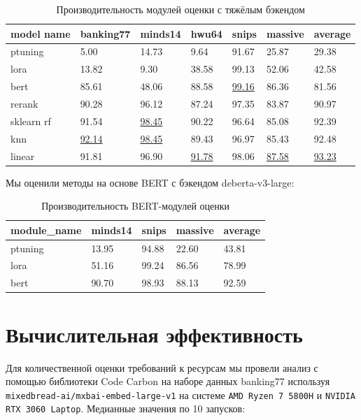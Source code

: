 \documentclass[14pt,a4paper,oneside,openany]{extbook}
\begin{document}
\begin{table}[h!]
\caption{\label{tbl:heavy_modules}Производительность модулей оценки с тяжёлым бэкендом}
\centering
\begin{tabular}{|p{2cm}|p{2cm}|p{2cm}|p{2cm}|p{2cm}|p{2cm}|p{2cm}|}
\hline
model name & banking77 & minds14 & hwu64 & snips & massive & average\\
\hline
ptuning & 5.00 & 14.73 & 9.64 & 91.67 & 25.87 & 29.38\\
\hline
lora & 13.82 & 9.30 & 38.58 & 99.13 & 52.06 & 42.58\\
\hline
bert & 85.61 & 48.06 & 88.58 & \uline{99.16} & 86.36 & 81.56\\
\hline
rerank & 90.28 & 96.12 & 87.24 & 97.35 & 83.87 & 90.97\\
\hline
sklearn rf & 91.54 & \uline{98.45} & 90.22 & 96.64 & 85.08 & 92.39\\
\hline
knn & \uline{92.14} & \uline{98.45} & 89.43 & 96.97 & 85.43 & 92.48\\
\hline
linear & 91.81 & 96.90 & \uline{91.78} & 98.06 & \uline{87.58} & \uline{93.23}\\
\hline
\end{tabular}
\end{table}
Мы оценили методы на основе BERT с бэкендом deberta-v3-large\autocite{he_debertav3_2023}:

\begin{table}[h!]
\caption{\label{tbl:bert_modules}Производительность BERT-модулей оценки}
\centering
\begin{tabular}{|p{2cm}|p{2cm}|p{2cm}|p{2cm}|p{2cm}|}
\hline
module\_name & minds14 & snips & massive & average\\
\hline
ptuning & 13.95 & 94.88 & 22.60 & 43.81\\
\hline
lora & 51.16 & 99.24 & 86.56 & 78.99\\
\hline
bert & 90.70 & 98.93 & 88.13 & 92.59\\
\hline
\end{tabular}
\end{table}
\section{Вычислительная эффективность}
\label{sec:orgf066745}

Для количественной оценки требований к ресурсам мы провели анализ с помощью библиотеки Code Carbon\autocite{benoit_courty_2024_11171501} на наборе данных banking77 используя \texttt{mixedbread-ai/mxbai-embed-large-v1}\autocite{li_angleoptimized_2024} на системе \texttt{AMD Ryzen 7 5800H} и \texttt{NVIDIA RTX 3060 Laptop}. Медианные значения по 10 запусков:
\end{document}
